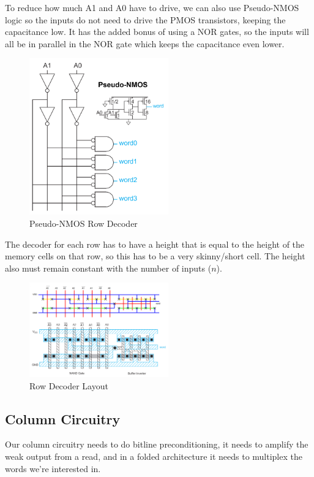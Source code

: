 \documentclass{article}
\begin{document}
 To reduce how much A1 and A0 have to drive, we can also use Pseudo-NMOS logic so the inputs do not need to drive the PMOS transistors, keeping the capacitance low. It has the added bonus of using a NOR gates, so the inputs will all be in parallel in the NOR gate which keeps the capacitance even lower. 
 
 \begin{figure}[ht!]
\centering
\includegraphics[width=60mm]{RowDecoderPs.png}
\caption{Pseudo-NMOS Row Decoder}
\end{figure}

The decoder for each row has to have a height that is equal to the height of the memory cells on that row, so this has to be a very skinny/short cell. The height also must remain constant with the number of inputs ($n$).

 \begin{figure}[ht!]
\centering
\includegraphics[width=60mm]{RowDecoder2.png}
\caption{Row Decoder Layout}
\end{figure}

\subsection{Column Circuitry}

Our column circuitry needs to do bitline preconditioning, it needs to amplify the weak output from a read, and in a folded architecture it needs to multiplex the words we're interested in. 
\end{document}
